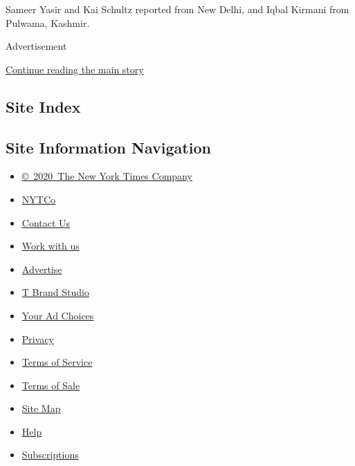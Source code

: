 Sameer Yasir and Kai Schultz reported from New Delhi, and Iqbal Kirmani
from Pulwama, Kashmir.

Advertisement

\protect\hyperlink{after-bottom}{Continue reading the main story}

\hypertarget{site-index}{%
\subsection{Site Index}\label{site-index}}

\hypertarget{site-information-navigation}{%
\subsection{Site Information
Navigation}\label{site-information-navigation}}

\begin{itemize}
\tightlist
\item
  \href{https://help.nytimes.com/hc/en-us/articles/115014792127-Copyright-notice}{©~2020~The
  New York Times Company}
\end{itemize}

\begin{itemize}
\tightlist
\item
  \href{https://www.nytco.com/}{NYTCo}
\item
  \href{https://help.nytimes.com/hc/en-us/articles/115015385887-Contact-Us}{Contact
  Us}
\item
  \href{https://www.nytco.com/careers/}{Work with us}
\item
  \href{https://nytmediakit.com/}{Advertise}
\item
  \href{http://www.tbrandstudio.com/}{T Brand Studio}
\item
  \href{https://www.nytimes.com/privacy/cookie-policy\#how-do-i-manage-trackers}{Your
  Ad Choices}
\item
  \href{https://www.nytimes.com/privacy}{Privacy}
\item
  \href{https://help.nytimes.com/hc/en-us/articles/115014893428-Terms-of-service}{Terms
  of Service}
\item
  \href{https://help.nytimes.com/hc/en-us/articles/115014893968-Terms-of-sale}{Terms
  of Sale}
\item
  \href{https://spiderbites.nytimes.com}{Site Map}
\item
  \href{https://help.nytimes.com/hc/en-us}{Help}
\item
  \href{https://www.nytimes.com/subscription?campaignId=37WXW}{Subscriptions}
\end{itemize}
